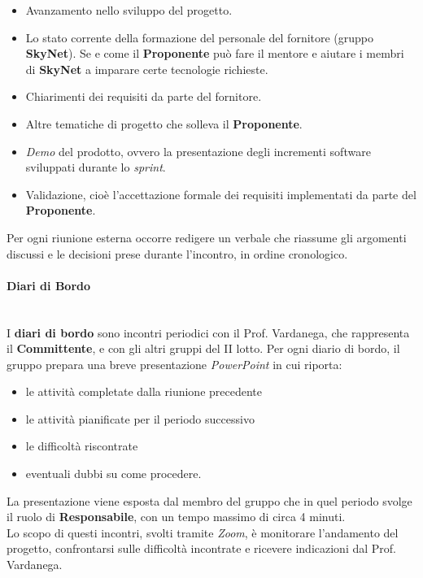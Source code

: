 \documentclass[12pt, a4paper]{article}
\begin{document}
\begin{itemize}
\item
  Avanzamento nello sviluppo del progetto.
 \item
  Lo stato corrente della formazione del personale del fornitore (gruppo \textbf{SkyNet}). Se e come il \textbf{Proponente} può fare il mentore e aiutare i membri di \textbf{SkyNet} a imparare certe tecnologie richieste.
 \item
  Chiarimenti dei requisiti da parte del fornitore.
\item
  Altre tematiche di progetto che solleva il \textbf{Proponente}.
 \item
  \textit{Demo} del prodotto, ovvero la presentazione degli incrementi software sviluppati durante lo \textit{sprint}.
 \item
  Validazione, cioè l'accettazione formale dei requisiti implementati da parte del \textbf{Proponente}.
 \end{itemize}

Per ogni riunione esterna occorre redigere un verbale che riassume gli argomenti discussi e le decisioni prese durante l'incontro, in ordine cronologico.

\paragraph{Diari di Bordo}\mbox{}\\
I \textbf{diari di bordo} sono incontri periodici con il Prof. Vardanega, che rappresenta il \textbf{Committente}, e con gli altri gruppi del II lotto. Per ogni diario di bordo, il gruppo prepara una breve presentazione \textit{PowerPoint} in cui riporta:

\begin{itemize}
    \item le attività completate dalla riunione precedente
    \item le attività pianificate per il periodo successivo
    \item le difficoltà riscontrate
    \item eventuali dubbi su come procedere.
\end{itemize}

La presentazione viene esposta dal membro del gruppo che in quel periodo svolge il ruolo di \textbf{Responsabile}, con un tempo massimo di circa 4 minuti.\\
Lo scopo di questi incontri, svolti tramite \textit{Zoom}, è monitorare l'andamento del progetto, confrontarsi sulle difficoltà incontrate e ricevere indicazioni dal Prof. Vardanega.
\end{document}
